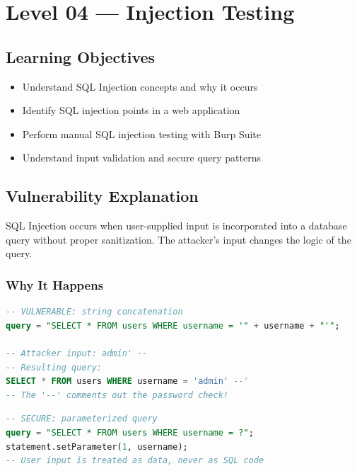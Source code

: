 \chapter{Level 04 — Injection Testing}
\label{ch:level04}


\section{Learning Objectives}
\begin{itemize}
  \item Understand SQL Injection concepts and why it occurs
  \item Identify SQL injection points in a web application
  \item Perform manual SQL injection testing with Burp Suite
  \item Understand input validation and secure query patterns
\end{itemize}

\section{Vulnerability Explanation}

SQL Injection occurs when user-supplied input is incorporated into a database query without proper sanitization. The attacker's input changes the logic of the query.

\subsection{Why It Happens}

\begin{lstlisting}[style=code, language=SQL, caption={Vulnerable query construction}]
-- VULNERABLE: string concatenation
query = "SELECT * FROM users WHERE username = '" + username + "'";

-- Attacker input: admin' --
-- Resulting query:
SELECT * FROM users WHERE username = 'admin' --'
-- The '--' comments out the password check!
\end{lstlisting}

\begin{lstlisting}[style=code, language=SQL, caption={Secure parameterized query}]
-- SECURE: parameterized query
query = "SELECT * FROM users WHERE username = ?";
statement.setParameter(1, username);
-- User input is treated as data, never as SQL code
\end{lstlisting}


